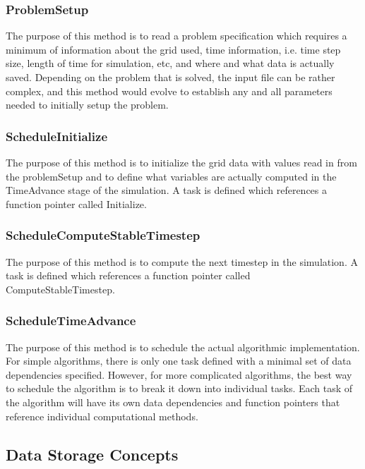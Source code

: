 \documentclass[12pt]{report}
\begin{document}
\subsubsection{ProblemSetup}



The purpose of this method is to read a problem specification which
requires a minimum of information about the grid used, time
information, i.e. time step size, length of time for simulation, etc,
and where and what data is actually saved.  Depending on the problem
that is solved, the input file can be rather complex, and this method
would evolve to establish any and all parameters needed to initially
setup the problem.

\subsubsection{ScheduleInitialize}

The purpose of this method is to initialize the grid data with values
read in from the problemSetup and to define what variables are
actually computed in the TimeAdvance stage of the simulation.  A task
is defined which references a function pointer called Initialize.

\subsubsection{ScheduleComputeStableTimestep}

The purpose of this method is to compute the next timestep in the
simulation.  A task is defined which references a function pointer
called ComputeStableTimestep.

\subsubsection{ScheduleTimeAdvance}

The purpose of this method is to schedule the actual algorithmic
implementation.  For simple algorithms, there is only one task defined
with a minimal set of data dependencies specified.  However, for more
complicated algorithms, the best way to schedule the algorithm is to
break it down into individual tasks.  Each task of the algorithm will
have its own data dependencies and function pointers that reference
individual computational methods.

\subsection{Data Storage Concepts}
\end{document}

